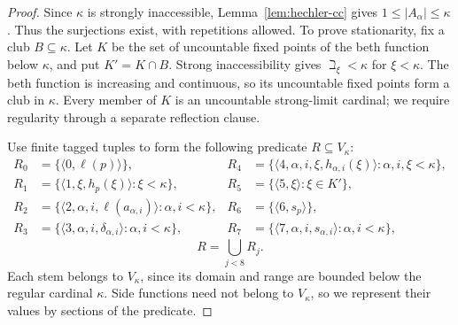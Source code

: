 \documentclass[10pt,a4paper]{amsart}
\theoremstyle{definition}
\theoremstyle{remark}
\begin{document}
\begin{proof}
Since \(\kappa\) is strongly inaccessible,
Lemma~\ref{lem:hechler-cc} gives \(1\leq|A_\alpha|\leq\kappa\).
Thus the surjections exist, with repetitions allowed. To prove
stationarity, fix a club \(B\subseteq\kappa\).
Let \(K\) be the set of uncountable fixed points of the beth
function below \(\kappa\), and put
\(K'=K\cap B\). Strong inaccessibility gives
\(\beth_\xi<\kappa\) for \(\xi<\kappa\). The beth function is
increasing and continuous, so its uncountable fixed points form a club
in \(\kappa\). Every member of \(K\) is an uncountable strong-limit
cardinal; we require regularity through a separate reflection clause.

Use finite tagged tuples to form the following predicate
\(R\subseteq V_\kappa\):
\[
\begin{aligned}
 R_0&=\{\langle0,\ell(p)\rangle\},&
 R_4&=\{\langle4,\alpha,i,\xi,h_{\alpha,i}(\xi)\rangle:
                                      \alpha,i,\xi<\kappa\},\\[.4em]
 R_1&=\{\langle1,\xi,h_p(\xi)\rangle:\xi<\kappa\},&
 R_5&=\{\langle5,\xi\rangle:\xi\in K'\},\\[.4em]
 R_2&=\{\langle2,\alpha,i,\ell(a_{\alpha,i})\rangle:
                                      \alpha,i<\kappa\},&
 R_6&=\{\langle6,s_p\rangle\},\\[.4em]
 R_3&=\{\langle3,\alpha,i,\delta_{\alpha,i}\rangle:
                                      \alpha,i<\kappa\},&
 R_7&=\{\langle7,\alpha,i,s_{\alpha,i}\rangle:
                                      \alpha,i<\kappa\},
\end{aligned}
\]
\[
 R=\bigcup_{j<8}R_j.
\]
Each stem belongs to \(V_\kappa\), since its domain and range
are bounded below the regular cardinal \(\kappa\). Side functions
need not belong to \(V_\kappa\), so we represent their values by
sections of the predicate.


\end{proof}
\end{document}
